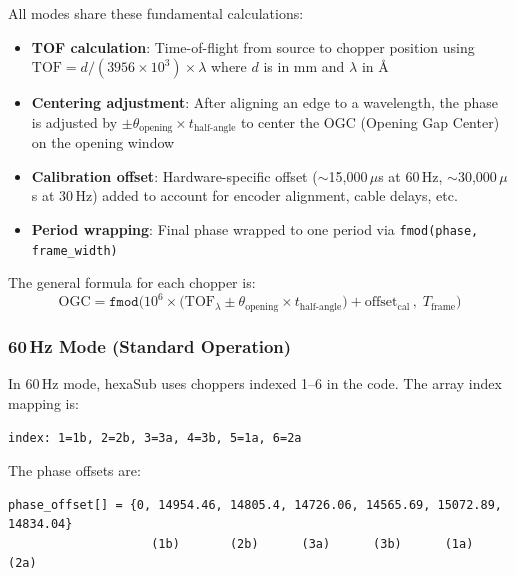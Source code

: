 \documentclass[11pt,letterpaper]{article}
\begin{document}
All modes share these fundamental calculations:

\begin{itemize}
    \item \textbf{TOF calculation}: Time-of-flight from source to chopper position using 
    $\text{TOF} = d / (3956 \times 10^3) \times \lambda$ where $d$ is in mm and $\lambda$ in \AA{}
    
    \item \textbf{Centering adjustment}: After aligning an edge to a wavelength, the phase is adjusted 
    by $\pm \theta_{\text{opening}} \times t_{\text{half-angle}}$ to center the OGC (Opening Gap Center) 
    on the opening window
    
    \item \textbf{Calibration offset}: Hardware-specific offset ($\sim$15,000\,$\mu$s at 60\,Hz, 
    $\sim$30,000\,$\mu$s at 30\,Hz) added to account for encoder alignment, cable delays, etc.
    
    \item \textbf{Period wrapping}: Final phase wrapped to one period via \texttt{fmod(phase, frame\_width)}
\end{itemize}

The general formula for each chopper is:
\begin{equation}
\text{OGC} = \texttt{fmod}\Big( 10^6 \times \big( \text{TOF}_\lambda \pm \theta_{\text{opening}} \times t_{\text{half-angle}} \big) + \text{offset}_{\text{cal}} \,,\; T_{\text{frame}} \Big)
\end{equation}

\subsubsection{60\,Hz Mode (Standard Operation)}

In 60\,Hz mode, hexaSub uses choppers indexed 1--6 in the code. The array index mapping is:

\begin{center}
\texttt{index: 1=1b, 2=2b, 3=3a, 4=3b, 5=1a, 6=2a}
\end{center}

The phase offsets are:

\begin{verbatim}
phase_offset[] = {0, 14954.46, 14805.4, 14726.06, 14565.69, 15072.89, 14834.04}
                    (1b)       (2b)      (3a)      (3b)      (1a)      (2a)
\end{verbatim}
\end{document}

